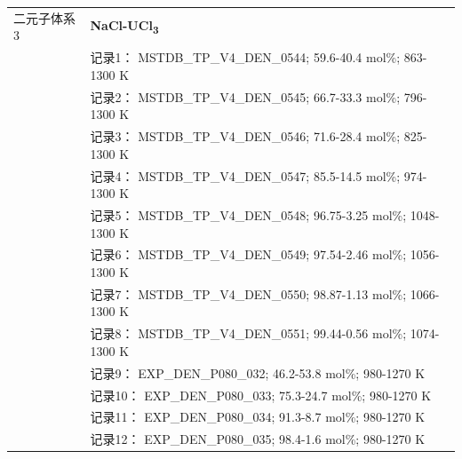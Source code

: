 \documentclass[12pt]{article}
\begin{document}
{\begin{longtable}[]{@{}
  >{\raggedright\arraybackslash}p{}
  >{\raggedright\arraybackslash}p{}@{}}
二元子体系 3  & \textbf{NaCl-UCl\textsubscript{3}} \\
 & 记录1： MSTDB\_TP\_V4\_DEN\_0544; 59.6-40.4 mol\%; 863-1300 K \\
 & 记录2： MSTDB\_TP\_V4\_DEN\_0545; 66.7-33.3 mol\%; 796-1300 K \\
 & 记录3： MSTDB\_TP\_V4\_DEN\_0546; 71.6-28.4 mol\%; 825-1300 K \\
 & 记录4： MSTDB\_TP\_V4\_DEN\_0547; 85.5-14.5 mol\%; 974-1300 K \\
 & 记录5： MSTDB\_TP\_V4\_DEN\_0548; 96.75-3.25 mol\%; 1048-1300 K \\
 & 记录6： MSTDB\_TP\_V4\_DEN\_0549; 97.54-2.46 mol\%; 1056-1300 K \\
 & 记录7： MSTDB\_TP\_V4\_DEN\_0550; 98.87-1.13 mol\%; 1066-1300 K \\
 & 记录8： MSTDB\_TP\_V4\_DEN\_0551; 99.44-0.56 mol\%; 1074-1300 K \\
 & 记录9： EXP\_DEN\_P080\_032; 46.2-53.8 mol\%; 980-1270 K \\
 & 记录10： EXP\_DEN\_P080\_033; 75.3-24.7 mol\%; 980-1270 K \\
 & 记录11： EXP\_DEN\_P080\_034; 91.3-8.7 mol\%; 980-1270 K \\
 & 记录12： EXP\_DEN\_P080\_035; 98.4-1.6 mol\%; 980-1270 K  \\


\end{longtable}}
\end{document}

